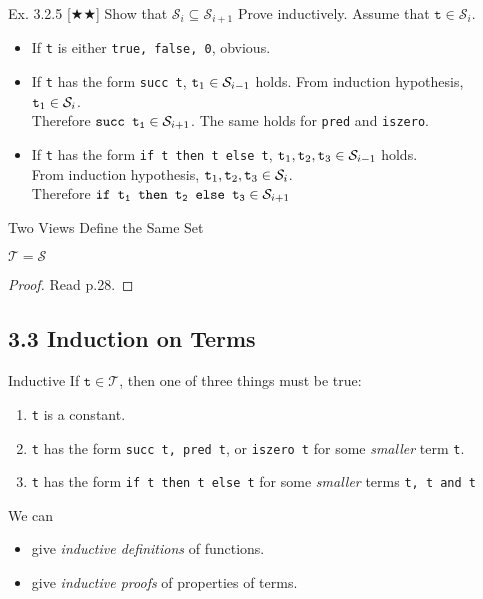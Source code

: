 \begin{frame}{Ex. 3.2.5 [$\bigstar\bigstar$] Show that $\mathcal{S}_i \subseteq \mathcal{S}_{i+1}$}
\pause
Prove inductively. Assume that $\texttt{t} \in \mathcal{S}_{i}$.\\
\begin{itemize}
  \item If \texttt{t} is either \texttt{true, false, 0}, obvious.
  \pause
  \item If \texttt{t} has the form \texttt{succ t}, $\mathtt{t\textsubscript{1}} \in \mathcal{S}_{i-1}$ holds.
        From induction hypothesis, $\mathtt{t\textsubscript{1}} \in \mathcal{S}_i$.\\
        Therefore $\texttt{succ t\textsubscript{1}} \in \mathcal{S}_{i+1}$.
        The same holds for \texttt{pred} and \texttt{iszero}.
  \pause
  \item If \texttt{t} has the form \texttt{if t then t else t}, $\mathtt{t\textsubscript{1}, t\textsubscript{2}, t\textsubscript{3}} \in \mathcal{S}_{i-1}$ holds.\\
        From induction hypothesis, $\mathtt{t\textsubscript{1}, t\textsubscript{2}, t\textsubscript{3}} \in \mathcal{S}_i$.\\
        Therefore $\texttt{if t\textsubscript{1} then t\textsubscript{2} else t\textsubscript{3}} \in \mathcal{S}_{i+1}$
\end{itemize}
\end{frame}

\begin{frame}{Two Views Define the Same Set}
\begin{proposition}[3.2.6]
  $\mathcal{T} = \mathcal{S}$
\end{proposition}
\begin{proof}
  Read p.28.
\end{proof}
\end{frame}

\subsection*{3.3 Induction on Terms}

\begin{frame}{Inductive}
If $\mathtt{t} \in \mathcal{T}$, then one of three things must be true:
\begin{enumerate}
  \item \texttt{t} is a constant.
  \item \texttt{t} has the form \texttt{succ t, pred t}, or \texttt{iszero t} for some \textit{smaller} term \texttt{t}.
  \item \texttt{t} has the form \texttt{if t then t else t} for some \textit{smaller} terms \texttt{t, t and t}
\end{enumerate}
We can
\begin{itemize}
  \item give \textit{inductive definitions} of functions.
  \item give \textit{inductive proofs} of properties of terms.
\end{itemize}
\end{frame}

